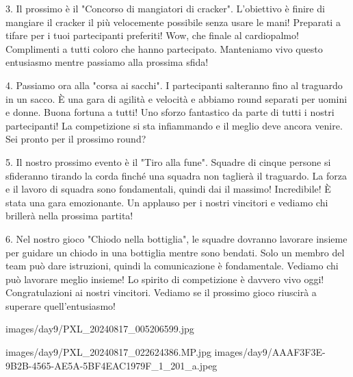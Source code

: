 3. Il prossimo è il "Concorso di mangiatori di cracker". L'obiettivo è finire di mangiare il cracker il più velocemente possibile senza usare le mani! Preparati a tifare per i tuoi partecipanti preferiti! Wow, che finale al cardiopalmo! Complimenti a tutti coloro che hanno partecipato. Manteniamo vivo questo entusiasmo mentre passiamo alla prossima sfida!
\newline

4. Passiamo ora alla "corsa ai sacchi". I partecipanti salteranno fino al traguardo in un sacco. È una gara di agilità e velocità e abbiamo round separati per uomini e donne. Buona fortuna a tutti! Uno sforzo fantastico da parte di tutti i nostri partecipanti! La competizione si sta infiammando e il meglio deve ancora venire. Sei pronto per il prossimo round?
\newline

5. Il nostro prossimo evento è il "Tiro alla fune". Squadre di cinque persone si sfideranno tirando la corda finché una squadra non taglierà il traguardo. La forza e il lavoro di squadra sono fondamentali, quindi dai il massimo! Incredibile! È stata una gara emozionante. Un applauso per i nostri vincitori e vediamo chi brillerà nella prossima partita!
\newline

6. Nel nostro gioco "Chiodo nella bottiglia", le squadre dovranno lavorare insieme per guidare un chiodo in una bottiglia mentre sono bendati. Solo un membro del team può dare istruzioni, quindi la comunicazione è fondamentale. Vediamo chi può lavorare meglio insieme! Lo spirito di competizione è davvero vivo oggi! Congratulazioni ai nostri vincitori. Vediamo se il prossimo gioco riuscirà a superare quell'entusiasmo!


\pagestyle{empty} %

                      {images/day9/PXL_20240817_005206599.jpg}
%

%

                      {images/day9/PXL_20240817_022624386.MP.jpg}
                      {images/day9/AAAF3F3E-9B2B-4565-AE5A-5BF4EAC1979F_1_201_a.jpeg}
%

